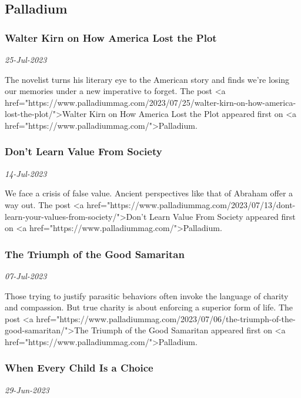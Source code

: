 \subsection{Palladium \href{https://www.palladiummag.com/}{}}
\subsubsection{Walter Kirn on How America Lost the Plot \href{https://www.palladiummag.com/2023/07/25/walter-kirn-on-how-america-lost-the-plot/}{}}
\textit{25-Jul-2023}

The novelist turns his literary eye to the American story and finds we're losing our memories under a new imperative to forget.
The post <a href="https://www.palladiummag.com/2023/07/25/walter-kirn-on-how-america-lost-the-plot/">Walter Kirn on How America Lost the Plot
 appeared first on <a href="https://www.palladiummag.com/">Palladium.
\subsubsection{Don’t Learn Value From Society \href{https://www.palladiummag.com/2023/07/13/dont-learn-your-values-from-society/}{}}
\textit{14-Jul-2023}

We face a crisis of false value. Ancient perspectives like that of Abraham offer a way out.
The post <a href="https://www.palladiummag.com/2023/07/13/dont-learn-your-values-from-society/">Don’t Learn Value From Society
 appeared first on <a href="https://www.palladiummag.com/">Palladium.
\subsubsection{The Triumph of the Good Samaritan \href{https://www.palladiummag.com/2023/07/06/the-triumph-of-the-good-samaritan/}{}}
\textit{07-Jul-2023}

Those trying to justify parasitic behaviors often invoke the language of charity and compassion. But true charity is about enforcing a superior form of life.
The post <a href="https://www.palladiummag.com/2023/07/06/the-triumph-of-the-good-samaritan/">The Triumph of the Good Samaritan
 appeared first on <a href="https://www.palladiummag.com/">Palladium.
\subsubsection{When Every Child Is a Choice \href{https://www.palladiummag.com/2023/06/29/when-every-child-is-a-choice/}{}}
\textit{29-Jun-2023}

